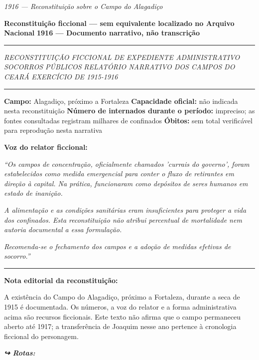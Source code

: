 
\noindent \textit{1916 --- Reconstituição sobre o Campo do Alagadiço}

\noindent \textbf{Reconstituição ficcional --- sem equivalente localizado no Arquivo Nacional}
\textbf{1916 --- Documento narrativo, não transcrição}

\vspace{0.5em}\noindent\rule{\textwidth}{0.5pt}\vspace{0.5em}

\noindent \textit{RECONSTITUIÇÃO FICCIONAL DE EXPEDIENTE ADMINISTRATIVO}
\textit{SOCORROS PÚBLICOS}
\textit{RELATÓRIO NARRATIVO DOS CAMPOS DO CEARÁ}
\textit{EXERCÍCIO DE 1915-1916}

\vspace{0.5em}\noindent\rule{\textwidth}{0.5pt}\vspace{0.5em}

\noindent \textbf{Campo:} Alagadiço, próximo a Fortaleza
\textbf{Capacidade oficial:} não indicada nesta reconstituição
\textbf{Número de internados durante o período:} impreciso; as fontes consultadas registram milhares de confinados
\textbf{Óbitos:} sem total verificável para reprodução nesta narrativa

\noindent \textbf{Voz do relator ficcional:}

\noindent \textit{\textquotedblleft{}Os campos de concentração, oficialmente chamados 'currais do governo', foram estabelecidos como medida emergencial para conter o fluxo de retirantes em direção à capital. Na prática, funcionaram como depósitos de seres humanos em estado de inanição.}

\noindent \textit{A alimentação e as condições sanitárias eram insuficientes para proteger a vida dos confinados. Esta reconstituição não atribui percentual de mortalidade nem autoria documental a essa formulação.}

\noindent \textit{Recomenda-se o fechamento dos campos e a adoção de medidas efetivas de socorro.\textquotedblright{}}

\vspace{0.5em}\noindent\rule{\textwidth}{0.5pt}\vspace{0.5em}

\noindent \textbf{Nota editorial da reconstituição:}

\noindent A existência do Campo do Alagadiço, próximo a Fortaleza, durante a seca de 1915 é documentada. Os números, a voz do relator e a forma administrativa acima são recursos ficcionais. Este texto não afirma que o campo permaneceu aberto até 1917; a transferência de Joaquim nesse ano pertence à cronologia ficcional do personagem.

\vspace{0.5em}
\noindent\textit{\textbf{↪ Rotas:}  \rotasep {}}